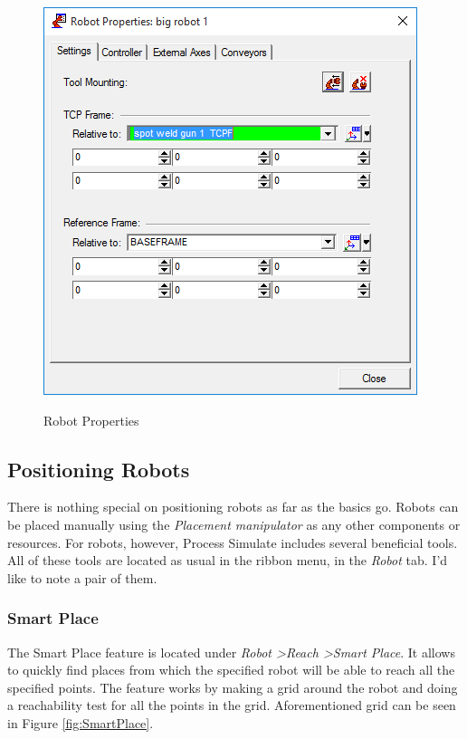 \begin{figure}[H]
    \caption{Robot Properties}
    \centering
    \includegraphics{robot_properties_toolframe}
    \label{fig:RobotProperties}
\end{figure}

\subsection{Positioning Robots}
There is nothing special on positioning robots as far as the basics go. 
Robots can be placed manually using the \emph{Placement manipulator} as any other components or resources.
For robots, however, Process Simulate includes several beneficial tools.
All of these tools are located as usual in the ribbon menu, in the \emph{Robot} tab.
I'd like to note a pair of them. \\

\subsubsection{Smart Place}
The Smart Place feature is located under \emph{Robot \textgreater Reach \textgreater Smart Place}.
It allows to quickly find places from which the specified robot will be able to reach all the specified points.
The feature works by making a grid around the robot and doing a reachability test for all the points in the grid.  
Aforementioned grid can be seen in Figure \ref{fig:SmartPlace}.


